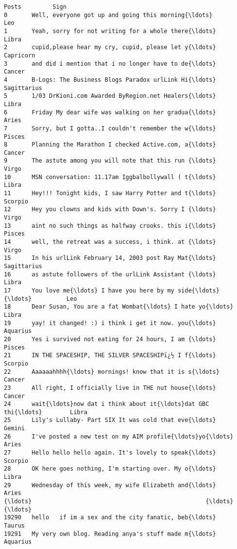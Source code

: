 \documentclass[11pt]{article}
\begin{document}
\begin{Verbatim}[commandchars=\\\{\}]
                                                   Posts         Sign  
0       Well, everyone got up and going this morning{\ldots}          Leo  
1       Yeah, sorry for not writing for a whole there{\ldots}        Libra  
2       cupid,please hear my cry, cupid, please let y{\ldots}    Capricorn  
3       and did i mention that i no longer have to de{\ldots}       Cancer  
4       B-Logs: The Business Blogs Paradox urlLink Hi{\ldots}  Sagittarius  
5       1/03 DrKioni.com Awarded ByRegion.net Healers{\ldots}        Libra  
6       Friday My dear wife was walking on her gradua{\ldots}        Aries  
7       Sorry, but I gotta..I couldn't remember the w{\ldots}       Pisces  
8       Planning the Marathon I checked Active.com, a{\ldots}       Cancer  
9       The astute among you will note that this run {\ldots}        Virgo  
10      MSN conversation: 11.17am Iggbalbollywall ( t{\ldots}        Libra  
11      Hey!!! Tonight kids, I saw Harry Potter and t{\ldots}      Scorpio  
12      Hey you clowns and kids with Down's. Sorry I {\ldots}        Virgo  
13      aint no such things as halfway crooks. this i{\ldots}       Pisces  
14      well, the retreat was a success, i think. at {\ldots}        Virgo  
15      In his urlLink February 14, 2003 post Ray Mat{\ldots}  Sagittarius  
16      as astute followers of the urlLink Assistant {\ldots}        Libra  
17      You love me{\ldots} I have you here by my side{\ldots} {\ldots}          Leo  
18      Dear Susan, You are a fat Wombat{\ldots} I hate yo{\ldots}        Libra  
19      yay! it changed! :) i think i get it now. you{\ldots}     Aquarius  
20      Yes i survived not eating for 24 hours, I am {\ldots}       Pisces  
21      IN THE SPACESHIP, THE SILVER SPACESHIPï¿½ I f{\ldots}      Scorpio  
22      Aaaaaahhhh{\ldots} mornings! know that it is s{\ldots}       Cancer  
23      All right, I officially live in THE nut house{\ldots}       Cancer  
24      wait{\ldots}now dat i think about it{\ldots}dat GBC thi{\ldots}        Libra  
25      Lily's Lullaby- Part SIX It was cold that eve{\ldots}       Gemini  
26      I've posted a new test on my AIM profile{\ldots}yo{\ldots}        Aries  
27      Hello hello hello again. It's lovely to speak{\ldots}      Scorpio  
28      OK here goes nothing, I'm starting over. My o{\ldots}        Libra  
29      Wednesday of this week, my wife Elizabeth and{\ldots}        Aries  
{\ldots}                                                  {\ldots}          {\ldots}  
19290   hello   if im a sex and the city fanatic, beb{\ldots}       Taurus  
19291   My very own blog. Reading anya's stuff made m{\ldots}     Aquarius  

\end{Verbatim}
\end{document}
